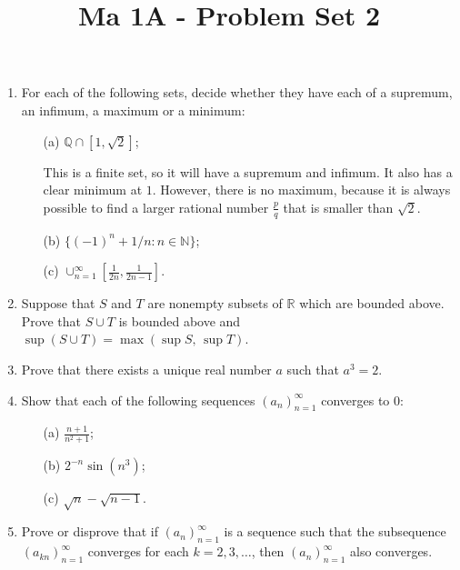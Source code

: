 \documentclass[11pt]{article}
\title{\vspace{-0.7cm}Ma 1A - Problem Set 2}
\date{}
\begin{document}
\maketitle

\begin{enumerate}

\item
For each of the following sets, decide whether they have each of a supremum, an infimum, a maximum or a minimum:
\begin{itemize}
\item[(a)] $\mathbb{Q} \cap [1, \sqrt{2}]$;

\bigskip
This is a finite set, so it will have a supremum and infimum. It also has a clear minimum at $1$. However, there is no maximum, because it is always possible to find a larger rational number $\frac{p}{q}$ that is smaller than $\sqrt{2}$. 

\item[(b)] $\{(-1)^n + 1/n : n \in \mathbb{N}\}$;

\bigskip


\item[(c)] $\cup_{n=1}^\infty [\frac{1}{2n}, \frac{1}{2n-1}]$.
\end{itemize}

\item
Suppose that $S$ and $T$ are nonempty subsets of $\mathbb{R}$ which are bounded above. Prove that $S \cup T$ is bounded above and $\sup (S\cup T) = \max(\sup S, \, \sup T)$.

\item
Prove that there exists a unique real number $a$ such that $a^3 = 2$.

\item
Show that each of the following sequences $(a_n)_{n=1}^\infty$ converges to $0$:
\begin{itemize}
\item[(a)] $\frac{n+1}{n^2 + 1}$;
\item[(b)] $2^{-n} \sin(n^3)$;
\item[(c)] $\sqrt{n} - \sqrt{n-1}$.
\end{itemize}


\item
Prove or disprove that if $(a_n)_{n=1}^\infty$ is a sequence such that the subsequence $(a_{kn})_{n=1}^\infty$ converges for each $k = 2, 3, \dots$, then $(a_n)_{n=1}^\infty$ also converges.

\end{enumerate}
\end{document}
